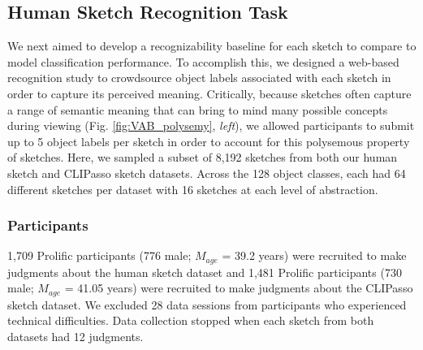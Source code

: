\documentclass[10pt,letterpaper]{article}
\begin{document}
\subsection{Human Sketch Recognition Task}
We next aimed to develop a recognizability baseline for each sketch to compare to model classification performance. 
To accomplish this, we designed a web-based recognition study to crowdsource object labels associated with each sketch in order to capture its perceived meaning.
Critically, because sketches often capture a range of semantic meaning that can bring to mind many possible concepts during viewing (Fig. \ref{fig:VAB_polysemy}, \textit{left}), we allowed participants to submit up to 5 object labels per sketch in order to account for this polysemous property of sketches. 
Here, we sampled a subset of 8,192 sketches from both our human sketch and CLIPasso sketch datasets.
Across the 128 object classes, each had 64 different sketches per dataset with 16 sketches at each level of abstraction.

\vspace{1em}
\subsubsection{Participants}
1,709 Prolific participants (776 male; $M_{age}$ = 39.2 years) were recruited to make judgments about the human sketch dataset and
1,481 Prolific participants (730 male; $M_{age}$ = 41.05 years) were recruited to make judgments about the CLIPasso sketch dataset.
We excluded 28 data sessions from participants who experienced technical difficulties. 
Data collection stopped when each sketch from both datasets had 12 judgments.
\end{document}
